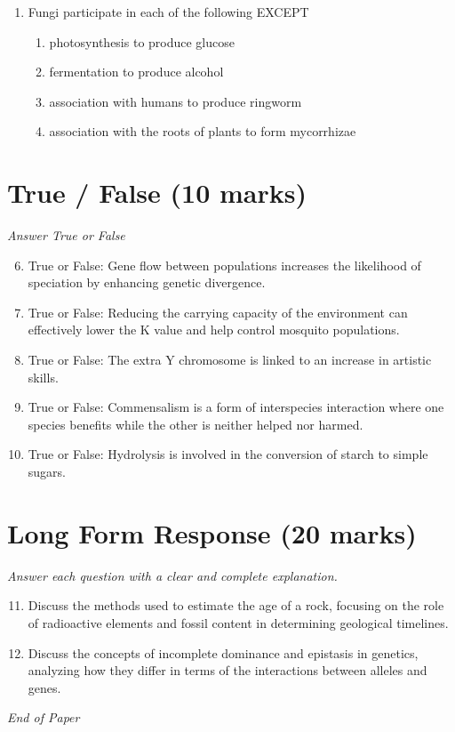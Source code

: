\documentclass[12pt]{article}
\begin{document}
\begin{enumerate}[label=\arabic*.]
\begin{enumerate}[label=(\alph*)]
    \item Aristotle, Darwin, and Lamarck
    \item Aristotle, Lyell, and Darwin
    \item Aristotle, Linnaeus, and Cuvier
    \item Aristotle, Cuvier, and Lamarck
    \item Linnaeus, Darwin, and Lamarck
\end{enumerate}
\item Fungi participate in each of the following EXCEPT
\begin{enumerate}[label=(\alph*)]
    \item photosynthesis to produce glucose
    \item fermentation to produce alcohol
    \item association with humans to produce ringworm
    \item association with the roots of plants to form mycorrhizae
\end{enumerate}
\end{enumerate}

\section*{True / False (10 marks)}
\textit{Answer True or False}
\begin{enumerate}[label=\arabic*.]
\setcounter{enumi}{5}
\item True or False: Gene flow between populations increases the likelihood of speciation by enhancing genetic divergence.
\item True or False: Reducing the carrying capacity of the environment can effectively lower the K value and help control mosquito populations.
\item True or False: The extra Y chromosome is linked to an increase in artistic skills.
\item True or False: Commensalism is a form of interspecies interaction where one species benefits while the other is neither helped nor harmed.
\item True or False: Hydrolysis is involved in the conversion of starch to simple sugars.
\end{enumerate}

\section*{Long Form Response (20 marks)}
\textit{Answer each question with a clear and complete explanation.}
\begin{enumerate}[label=\arabic*.]
\setcounter{enumi}{10}
\item Discuss the methods used to estimate the age of a rock, focusing on the role of radioactive elements and fossil content in determining geological timelines.
\item Discuss the concepts of incomplete dominance and epistasis in genetics, analyzing how they differ in terms of the interactions between alleles and genes.
\end{enumerate}

\vfill
\noindent\textit{End of Paper}
\end{document}
